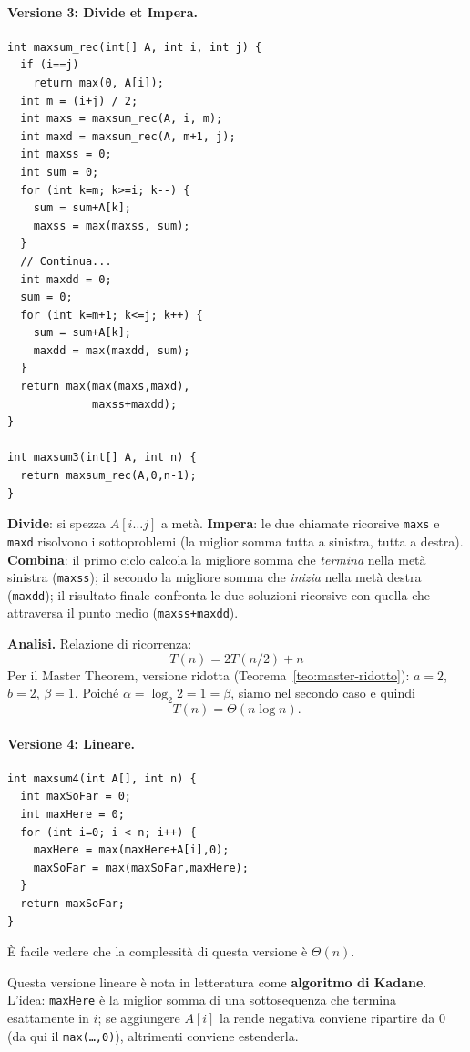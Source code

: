 \documentclass[12pt, a4paper]{article}
\begin{document}
\paragraph{Versione 3: Divide et Impera.}
\begin{verbatim}
int maxsum_rec(int[] A, int i, int j) {
  if (i==j)
    return max(0, A[i]);
  int m = (i+j) / 2;
  int maxs = maxsum_rec(A, i, m);
  int maxd = maxsum_rec(A, m+1, j);
  int maxss = 0;
  int sum = 0;
  for (int k=m; k>=i; k--) {
    sum = sum+A[k];
    maxss = max(maxss, sum);
  }
  // Continua...
  int maxdd = 0;
  sum = 0;
  for (int k=m+1; k<=j; k++) {
    sum = sum+A[k];
    maxdd = max(maxdd, sum);
  }
  return max(max(maxs,maxd),
             maxss+maxdd);
}

int maxsum3(int[] A, int n) {
  return maxsum_rec(A,0,n-1);
}
\end{verbatim}
\textbf{Divide}: si spezza $A[i\ldots j]$ a metà. \textbf{Impera}: le due chiamate ricorsive \texttt{maxs} e \texttt{maxd} risolvono i sottoproblemi (la miglior somma tutta a sinistra, tutta a destra). \textbf{Combina}: il primo ciclo calcola la migliore somma che \emph{termina} nella metà sinistra (\texttt{maxss}); il secondo la migliore somma che \emph{inizia} nella metà destra (\texttt{maxdd}); il risultato finale confronta le due soluzioni ricorsive con quella che attraversa il punto medio (\texttt{maxss+maxdd}).

\textbf{Analisi.} Relazione di ricorrenza:
$$T(n) = 2T(n/2) + n$$
Per il Master Theorem, versione ridotta (Teorema~\ref{teo:master-ridotto}): $a=2$, $b=2$, $\beta=1$. Poiché $\alpha=\log_2 2=1=\beta$, siamo nel secondo caso e quindi
$$T(n) = \Theta(n\log n).$$

\paragraph{Versione 4: Lineare.}
\begin{verbatim}
int maxsum4(int A[], int n) {
  int maxSoFar = 0;
  int maxHere = 0;
  for (int i=0; i < n; i++) {
    maxHere = max(maxHere+A[i],0);
    maxSoFar = max(maxSoFar,maxHere);
  }
  return maxSoFar;
}
\end{verbatim}
È facile vedere che la complessità di questa versione è $\Theta(n)$.

\begin{tcolorbox}[colback=lightergray!5, colframe=tocsubsec, title=\textbf{Nota mia (non nelle slide): il nome dell'algoritmo}]
Questa versione lineare è nota in letteratura come \textbf{algoritmo di Kadane}. L'idea: \texttt{maxHere} è la miglior somma di una sottosequenza che termina esattamente in $i$; se aggiungere $A[i]$ la rende negativa conviene ripartire da $0$ (da qui il \texttt{max(\ldots,0)}), altrimenti conviene estenderla.
\end{tcolorbox}
\end{document}
